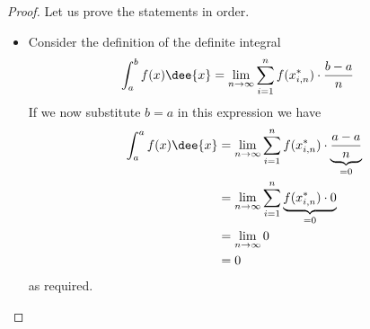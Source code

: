 \begin{proof}
Let us prove the statements in order.
\begin{itemize}
 \item Consider the definition of the definite integral
\begin{align*}
  \int_a^b f(x) \dee{x} &= \lim_{n \to \infty} \sum_{i=1}^n
f(x_{i,n}^*)\cdot\frac{b-a}{n}
\end{align*}
If we now substitute $b=a$ in this expression we have
\begin{align*}
  \int_a^a f(x) \dee{x}
  &= \lim_{n \to \infty} \sum_{i=1}^n
f(x_{i,n}^*)\cdot\underbrace{\frac{a-a}{n}}_{=0}\\
  &= \lim_{n \to \infty} \sum_{i=1}^n \underbrace{f(x_{i,n}^*)\cdot 0}_{=0}\\
  &= \lim_{n \to \infty} 0 \\
  &= 0
\end{align*}
as required.


\end{itemize}
\end{proof}
